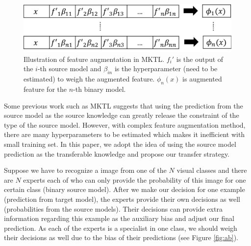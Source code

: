 
\begin{figure}
	\centering
	\includegraphics[scale=0.4]{fig/mktl.png}
	\caption{Illustration of feature augmentation in MKTL. $f_i'$ is the output of the $i$-th source model and $\beta_{in}$ is the hyperparameter (need to be estimated) to weigh the augmented feature. $\phi_n(x)$ is augmented feature for the $n$-th binary model.}
	\label{fig:mktl}
\end{figure}
Some previous work such as MKTL\cite{jie2011multiclass} suggests that using the prediction from the source model as the source knowledge can greatly release the constraint of the type of the source model. However, with complex feature augmentation method, there are many hyperparameters to be estimated which makes it inefficient with small training set. In this paper, we adopt the idea of using the source model prediction as the transferable knowledge and propose our transfer strategy.

Suppose we have to recognize a image from one of the $N$ visual classes and there are $N$ experts each of who can only provide the probability of this image for one certain class (binary source model). After we make our decision for one example (prediction from target model), the experts provide their own decisions as well (probabilities from the source models). Their decisions can provide extra information regarding this example as the auxiliary bias and adjust our final prediction.
As each of the experts is a specialist in one class, we should weigh their decisions as well due to the bias of their predictions (see Figure \ref{fig:ab}). 

